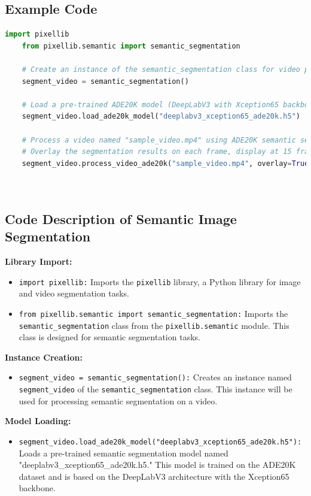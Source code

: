 \subsection{Example Code}
\begin{lstlisting}[language=Python]
    import pixellib
    from pixellib.semantic import semantic_segmentation
    
    # Create an instance of the semantic_segmentation class for video processing
    segment_video = semantic_segmentation()
    
    # Load a pre-trained ADE20K model (DeepLabV3 with Xception65 backbone)
    segment_video.load_ade20k_model("deeplabv3_xception65_ade20k.h5")
    
    # Process a video named "sample_video.mp4" using ADE20K semantic segmentation
    # Overlay the segmentation results on each frame, display at 15 frames per second, and save as "output_video.mp4"
    segment_video.process_video_ade20k("sample_video.mp4", overlay=True, frames_per_second=15, output_video_name="output_video.mp4")
    
    
\end{lstlisting}


\subsection*{Code Description of Semantic Image Segmentation}




\textbf{Library Import:}
\begin{itemize}
    \item \texttt{import pixellib:} Imports the \texttt{pixellib} library, a Python library for image and video segmentation tasks.
    \item \texttt{from pixellib.semantic import semantic\_segmentation:} Imports the \texttt{semantic\_segmentation} class from the \texttt{pixellib.semantic} module. This class is designed for semantic segmentation tasks.
\end{itemize}

\textbf{Instance Creation:}
\begin{itemize}
    \item \texttt{segment\_video = semantic\_segmentation():} Creates an instance named \texttt{segment\_video} of the \texttt{semantic\_segmentation} class. This instance will be used for processing semantic segmentation on a video.
\end{itemize}

\textbf{Model Loading:}
\begin{itemize}
    \item \texttt{segment\_video.load\_ade20k\_model("deeplabv3\_xception65\_ade20k.h5"):} Loads a pre-trained semantic segmentation model named "deeplabv3\_xception65\_ade20k.h5." This model is trained on the ADE20K dataset and is based on the DeepLabV3 architecture with the Xception65 backbone.
\end{itemize}

